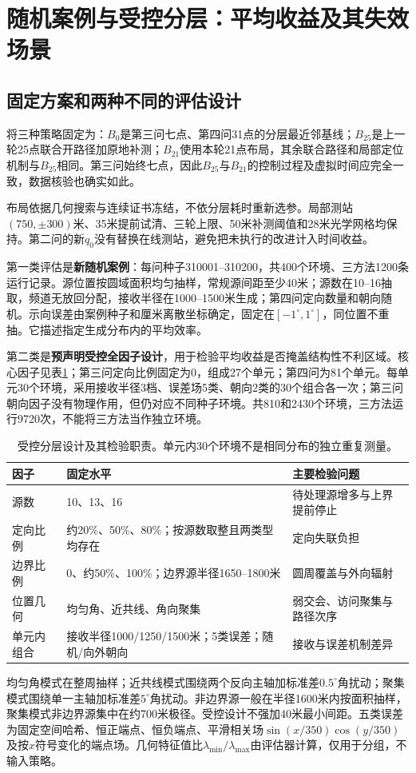 \documentclass[UTF8,a4paper,zihao=-4,fontset=mac]{ctexart}
\begin{document}
\section{随机案例与受控分层：平均收益及其失效场景}
\subsection{固定方案和两种不同的评估设计}
将三种策略固定为：$B_0$是第三问七点、第四问31点的分层最近邻基线；$B_{25}$是上一轮25点联合开路径加原地补测；$B_{21}$使用本轮21点布局，其余联合路径和局部定位机制与$B_{25}$相同。第三问始终七点，因此$B_{25}$与$B_{21}$的控制过程及虚拟时间应完全一致，数据核验也确实如此。

布局依据几何搜索与连续证书冻结，不依分层耗时重新选参。局部测站$(750,\pm300)$米、35米提前试清、三轮上限、50米补测阈值和28米光学网格均保持。第二问的新$q_0$没有替换在线测站，避免把未执行的改进计入时间收益。

第一类评估是\textbf{新随机案例}：每问种子310001--310200，共400个环境、三方法1200条运行记录。源位置按圆域面积均匀抽样，常规源间距至少40米；源数在10--16抽取，频道无放回分配，接收半径在1000--1500米生成；第四问定向数量和朝向随机。示向误差由案例种子和厘米离散坐标确定，固定在$[-1^\circ,1^\circ]$，同位置不重抽。它描述指定生成分布内的平均效率。

第二类是\textbf{预声明受控全因子设计}，用于检验平均收益是否掩盖结构性不利区域。核心因子见表\ref{tab:design}；第三问定向比例固定为0，组成27个单元；第四问为81个单元。每单元30个环境，采用接收半径3档、误差场5类、朝向2类的30个组合各一次；第三问朝向因子没有物理作用，但仍对应不同种子环境。共810和2430个环境，三方法运行9720次，不能将三方法当作独立环境。

\begin{table}[H]\centering\small
\caption{受控分层设计及其检验职责。单元内30个环境不是相同分布的独立重复测量。}\label{tab:design}
\begin{tabular}{p{2.3cm}p{6.3cm}p{4.6cm}}\toprule
因子 & 固定水平 & 主要检验问题\\\midrule
源数 &10、13、16 & 待处理源增多与上界提前停止\\
定向比例 &约20\%、50\%、80\%；按源数取整且两类型均存在 & 定向失联负担\\
边界比例 &0、约50\%、100\%；边界源半径1650--1800米 & 圆周覆盖与外向辐射\\
位置几何 &均匀角、近共线、角向聚集 & 弱交会、访问聚集与路径次序\\
单元内组合 &接收半径1000/1250/1500米；5类误差；随机/向外朝向 & 接收与误差机制差异\\\bottomrule
\end{tabular}
\end{table}
均匀角模式在整周抽样；近共线模式围绕两个反向主轴加标准差$0.5^\circ$角扰动；聚集模式围绕单一主轴加标准差$5^\circ$角扰动。非边界源一般在半径1600米内按面积抽样，聚集模式非边界源集中在约700米极径。受控设计不强加40米最小间距。五类误差为固定空间哈希、恒正端点、恒负端点、平滑相关场$\sin(x/350)\cos(y/350)$及按$x$符号变化的端点场。几何特征值比$\lambda_{\min}/\lambda_{\max}$由评估器计算，仅用于分组，不输入策略。
\end{document}
